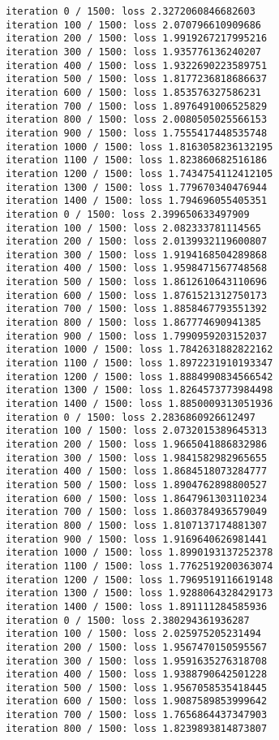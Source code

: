 \documentclass[11pt]{article}
\begin{document}
    \begin{Verbatim}[commandchars=\\\{\}]
iteration 0 / 1500: loss 2.3272060846682603
iteration 100 / 1500: loss 2.070796610909686
iteration 200 / 1500: loss 1.9919267217995216
iteration 300 / 1500: loss 1.935776136240207
iteration 400 / 1500: loss 1.9322690223589751
iteration 500 / 1500: loss 1.8177236818686637
iteration 600 / 1500: loss 1.853576327586231
iteration 700 / 1500: loss 1.8976491006525829
iteration 800 / 1500: loss 2.0080505025566153
iteration 900 / 1500: loss 1.7555417448535748
iteration 1000 / 1500: loss 1.8163058236132195
iteration 1100 / 1500: loss 1.823860682516186
iteration 1200 / 1500: loss 1.7434754112412105
iteration 1300 / 1500: loss 1.779670340476944
iteration 1400 / 1500: loss 1.794696055405351
iteration 0 / 1500: loss 2.399650633497909
iteration 100 / 1500: loss 2.082333781114565
iteration 200 / 1500: loss 2.0139932119600807
iteration 300 / 1500: loss 1.9194168504289868
iteration 400 / 1500: loss 1.9598471567748568
iteration 500 / 1500: loss 1.8612610643110696
iteration 600 / 1500: loss 1.8761521312750173
iteration 700 / 1500: loss 1.8858467793551392
iteration 800 / 1500: loss 1.867774690941385
iteration 900 / 1500: loss 1.7990959203152037
iteration 1000 / 1500: loss 1.7842631882822162
iteration 1100 / 1500: loss 1.8972231910193347
iteration 1200 / 1500: loss 1.8884990834566542
iteration 1300 / 1500: loss 1.8264573773984498
iteration 1400 / 1500: loss 1.8850009313051936
iteration 0 / 1500: loss 2.2836860926612497
iteration 100 / 1500: loss 2.0732015389645313
iteration 200 / 1500: loss 1.9665041886832986
iteration 300 / 1500: loss 1.9841582982965655
iteration 400 / 1500: loss 1.8684518073284777
iteration 500 / 1500: loss 1.8904762898800527
iteration 600 / 1500: loss 1.8647961303110234
iteration 700 / 1500: loss 1.8603784936579049
iteration 800 / 1500: loss 1.8107137174881307
iteration 900 / 1500: loss 1.9169640626981441
iteration 1000 / 1500: loss 1.8990193137252378
iteration 1100 / 1500: loss 1.7762519200363074
iteration 1200 / 1500: loss 1.7969519116619148
iteration 1300 / 1500: loss 1.9288064328429173
iteration 1400 / 1500: loss 1.891111284585936
iteration 0 / 1500: loss 2.380294361936287
iteration 100 / 1500: loss 2.025975205231494
iteration 200 / 1500: loss 1.9567470150595567
iteration 300 / 1500: loss 1.9591635276318708
iteration 400 / 1500: loss 1.9388790642501228
iteration 500 / 1500: loss 1.9567058535418445
iteration 600 / 1500: loss 1.9087589853999642
iteration 700 / 1500: loss 1.7656864437347903
iteration 800 / 1500: loss 1.8239893814873807

\end{Verbatim}
\end{document}
